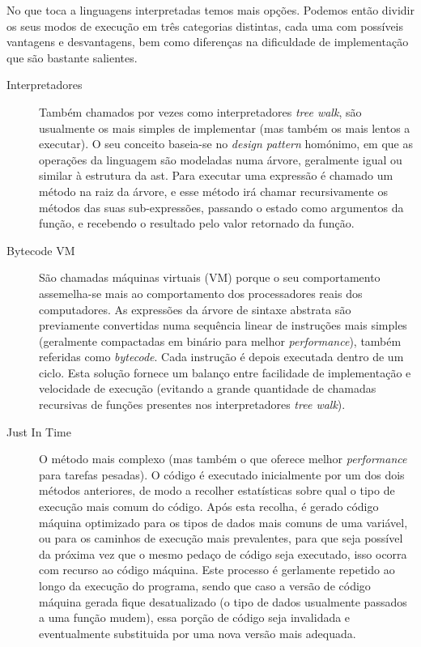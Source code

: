 No que toca a linguagens interpretadas temos mais opções. Podemos então dividir os seus modos de execução em três categorias distintas, cada uma com possíveis vantagens e desvantagens, bem como diferenças na dificuldade de implementação que são bastante salientes.
\begin{description}
 \item[Interpretadores] Também chamados por vezes como interpretadores \textit{tree walk}, são usualmente os mais simples de implementar (mas também os mais lentos a executar). O seu conceito baseia-se no \textit{design pattern} homónimo, em que as operações da linguagem são modeladas numa árvore, geralmente igual ou similar à estrutura da \acrshort{ast}. Para executar uma expressão é chamado um método na raiz da árvore, e esse método irá chamar recursivamente os métodos das suas sub-expressões, passando o estado como argumentos da função, e recebendo o resultado pelo valor retornado da função.
 \item[Bytecode VM] São chamadas máquinas virtuais (VM) porque o seu comportamento assemelha-se mais ao comportamento dos processadores reais dos computadores. As expressões da árvore de sintaxe abstrata são previamente convertidas numa sequência linear de instruções mais simples (geralmente compactadas em binário para melhor \textit{performance}), também referidas como \textit{bytecode}. Cada instrução é depois executada dentro de um ciclo. Esta solução fornece um balanço entre facilidade de implementação e velocidade de execução (evitando a grande quantidade de chamadas recursivas de funções presentes nos interpretadores \textit{tree walk}).
 \item[Just In Time] O método mais complexo (mas também o que oferece melhor \textit{performance} para tarefas pesadas). O código é executado inicialmente por um dos dois métodos anteriores, de modo a recolher estatísticas sobre qual o tipo de execução mais comum do código. Após esta recolha, é gerado código máquina optimizado para os tipos de dados mais comuns de uma variável, ou para os caminhos de execução mais prevalentes, para que seja possível da próxima vez que o mesmo pedaço de código seja executado, isso ocorra com recurso ao código máquina. Este processo é gerlamente repetido ao longo da execução do programa, sendo que caso a versão de código máquina gerada fique desatualizado (o tipo de dados usualmente passados a uma função mudem), essa porção de código seja invalidada e eventualmente substituida por uma nova versão mais adequada.
 \end{description}

